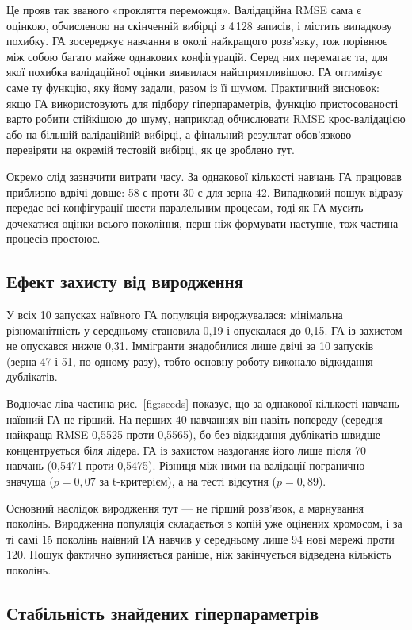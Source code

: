 \documentclass[14pt,a4paper]{extreport}
\begin{document}
Це прояв так званого «прокляття переможця». Валідаційна RMSE сама є оцінкою, обчисленою на скінченній вибірці з 4\,128 записів, і містить випадкову похибку. ГА зосереджує навчання в околі найкращого розв'язку, тож порівнює між собою багато майже однакових конфігурацій. Серед них перемагає та, для якої похибка валідаційної оцінки виявилася найсприятливішою. ГА оптимізує саме ту функцію, яку йому задали, разом із її шумом. Практичний висновок: якщо ГА використовують для підбору гіперпараметрів, функцію пристосованості варто робити стійкішою до шуму, наприклад обчислювати RMSE крос-валідацією або на більшій валідаційній вибірці, а фінальний результат обов'язково перевіряти на окремій тестовій вибірці, як це зроблено тут.

Окремо слід зазначити витрати часу. За однакової кількості навчань ГА працював приблизно вдвічі довше: 58 с проти 30 с для зерна 42. Випадковий пошук відразу передає всі конфігурації шести паралельним процесам, тоді як ГА мусить дочекатися оцінки всього покоління, перш ніж формувати наступне, тож частина процесів простоює.

\subsection{Ефект захисту від виродження}

У всіх 10 запусках наївного ГА популяція вироджувалася: мінімальна різноманітність у середньому становила 0,19 і опускалася до 0,15. ГА із захистом не опускався нижче 0,31. Іммігранти знадобилися лише двічі за 10 запусків (зерна 47 і 51, по одному разу), тобто основну роботу виконало відкидання дублікатів.

Водночас ліва частина рис.~\ref{fig:seeds} показує, що за однакової кількості навчань наївний ГА не гірший. На перших 40 навчаннях він навіть попереду (середня найкраща RMSE 0,5525 проти 0,5565), бо без відкидання дублікатів швидше концентрується біля лідера. ГА із захистом наздоганяє його лише після 70 навчань (0,5471 проти 0,5475). Різниця між ними на валідації погранично значуща ($p = 0{,}07$ за t-критерієм), а на тесті відсутня ($p = 0{,}89$).

Основний наслідок виродження тут --- не гірший розв'язок, а марнування поколінь. Виродженна популяція складається з копій уже оцінених хромосом, і за ті самі 15 поколінь наївний ГА навчив у середньому лише 94 нові мережі проти 120. Пошук фактично зупиняється раніше, ніж закінчується відведена кількість поколінь.

\subsection{Стабільність знайдених гіперпараметрів}
\end{document}
